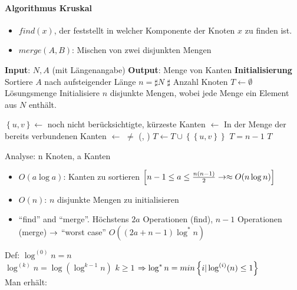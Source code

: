 \documentclass[a4paper,twoside,DIV15,BCOR12mm]{scrbook}
\begin{document}
\paragraph{Algorithmus Kruskal}
\begin{itemize}
\item $find(x)$, der feststellt in welcher Komponente der Knoten $x$ zu finden ist.
\item $merge(A,B)$: Mischen von zwei disjunkten Mengen
\end{itemize}

\begin{codebox}
\zi \textbf{Input}: $N,A$ (mit Längenangabe)
\zi \textbf{Output}: Menge von Kanten
\zi
\zi \textbf{Initialisierung}
\li Sortiere $A$ nach aufsteigender Länge
\li $n=\sharp N$ \Comment $\sharp$ Anzahl Knoten
\li $T \gets \emptyset$ \Comment Lösungsmenge
\li Initialisiere $n$ disjunkte Mengen, wobei jede Menge ein Element aus $N$ enthält.


\li \Repeat
\li	  $\left\{u,v\right\} \gets$ noch nicht berücksichtigte, kürzeste Kanten
\li	  {} $\gets$  \Comment In der Menge der bereits verbundenen Kanten
\li   {} $\gets$ 
\li	  \If 
           $\neq$ 
\li   \Then
			    (, )
      \End
\li   $T \gets T \cup \left\{ \left\{u,v\right\} \right\}$
\li \Until $T = n-1$
\li \Return $T$
\end{codebox}

Analyse: n Knoten, a Kanten

\begin{itemize}
\item $O(a \log{a})$: Kanten zu sortieren $\left[n-1 \leq a \leq \frac{n(n-1)}{2} \rightarrow \approx O(n \log{n})\right]$
\item $O(n)$: $n$ disjunkte Mengen zu initialisieren 
\item "`find"' and "`merge"'. Höchstens $2a$ Operationen (find), $n-1$ Operationen (merge) $\rightarrow$ "`worst case"' $O((2a+n-1) \log^{\ast}n)$\\
\end{itemize}

Def: $\log^{(0)}n = n$\\
$\log^{(k)}n = \log{(\log^{k-1}n)}$ $k \geq 1$ $\Rightarrow \log^{\ast}n = min\left\{i|\log^{(i)}(n)\leq 1\right\}$\\

Man erhält:\\
\end{document}
